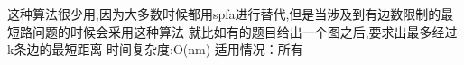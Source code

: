 这种算法很少用,因为大多数时候都用spfa进行替代,但是当涉及到有边数限制的最短路问题的时候会采用这种算法
就比如有的题目给出一个图之后,要求出最多经过k条边的最短距离
时间复杂度:O(nm)
适用情况：所有